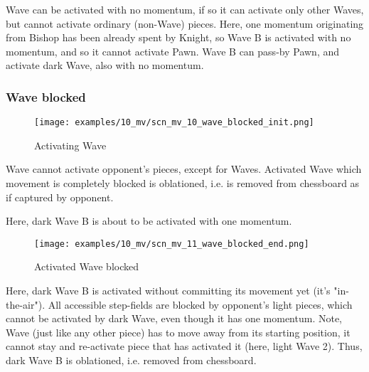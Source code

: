 Wave can be activated with no momentum, if so it can activate only other Waves, but
cannot activate ordinary (non-Wave) pieces. Here, one momentum originating from Bishop
has been already spent by Knight, so Wave B is activated with no momentum, and so it
cannot activate Pawn. Wave B can pass-by Pawn, and activate dark Wave, also with no
momentum.

\clearpage %

\subsubsection*{Wave blocked}

\vspace*{-3.0ex}
\noindent
\begin{figure}[h]
\texttt{[image: examples/10\_mv/scn\_mv\_10\_wave\_blocked\_init.png]}
\caption{Activating Wave}
\label{fig:scn_mv_10_wave_blocked_init}
\end{figure}

Wave cannot activate opponent's pieces, except for Waves. Activated Wave which movement
is completely blocked is oblationed, i.e. is removed from chessboard as if captured by
opponent.

Here, dark Wave B is about to be activated with one momentum.

\clearpage %

\vspace*{-5.0ex}
\noindent
\begin{figure}[h]
\texttt{[image: examples/10\_mv/scn\_mv\_11\_wave\_blocked\_end.png]}
\caption{Activated Wave blocked}
\label{fig:scn_mv_11_wave_blocked_end}
\end{figure}

Here, dark Wave B is activated without committing its movement yet (it's "in-the-air").
All accessible step-fields are blocked by opponent's light pieces, which cannot be
activated by dark Wave, even though it has one momentum.
Note, Wave (just like any other piece) has to move away from its starting position,
it cannot stay and re-activate piece that has activated it (here, light Wave 2).
Thus, dark Wave B is oblationed, i.e. removed from chessboard.

